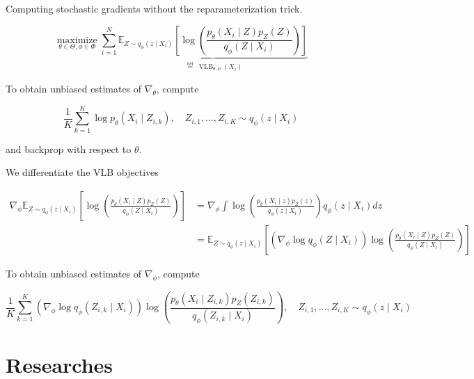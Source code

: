 \documentclass{report}
\begin{document}
\begin{concept}
    Computing stochastic gradients without the reparameterization trick.

    $$
    \underset{\theta \in \Theta, \phi \in \Phi}{\operatorname{maximize}} \sum_{i=1}^{N} \underbrace{\mathbb{E}_{Z \sim q_{\phi}\left(z \mid X_{i}\right)}\left[\log \left(\frac{p_{\theta}\left(X_{i} \mid Z\right) p_{Z}(Z)}{q_{\phi}\left(Z \mid X_{i}\right)}\right)\right]}_{\stackrel{\text { def }}{=} \operatorname{VLB}_{\theta, \phi}\left(X_{i}\right)}
    $$

    To obtain unbiased estimates of $\nabla_{\theta}$, compute

    $$
    \frac{1}{K} \sum_{k=1}^{K} \log p_{\theta}\left(X_{i} \mid Z_{i, k}\right), \quad Z_{i, 1}, \ldots, Z_{i, K} \sim q_{\phi}\left(z \mid X_{i}\right)
    $$

    and backprop with respect to $\theta$.

    We differentiate the VLB objectives

    $$
    \begin{aligned}
    \nabla_{\phi} \mathbb{E}_{Z \sim q_{\phi}\left(z \mid X_{i}\right)}\left[\log \left(\frac{p_{\theta}\left(X_{i} \mid Z\right) p_{Z}(Z)}{q_{\phi}\left(Z \mid X_{i}\right)}\right)\right] & =\nabla_{\phi} \int \log \left(\frac{p_{\theta}\left(X_{i} \mid z\right) p_{Z}(z)}{q_{\phi}\left(z \mid X_{i}\right)}\right) q_{\phi}\left(z \mid X_{i}\right) d z \\
    & =\mathbb{E}_{Z \sim q_{\phi}\left(z \mid X_{i}\right)}\left[\left(\nabla_{\phi} \log q_{\phi}\left(Z \mid X_{i}\right)\right) \log \left(\frac{p_{\theta}\left(X_{i} \mid Z\right) p_{Z}(Z)}{q_{\phi}\left(Z \mid X_{i}\right)}\right)\right]
    \end{aligned}
    $$

    To obtain unbiased estimates of $\nabla_{\phi}$, compute

    $$
    \frac{1}{K} \sum_{k=1}^{K}\left(\nabla_{\phi} \log q_{\phi}\left(Z_{i, k} \mid X_{i}\right)\right) \log \left(\frac{p_{\theta}\left(X_{i} \mid Z_{i, k}\right) p_{Z}\left(Z_{i, k}\right)}{q_{\phi}\left(Z_{i, k} \mid X_{i}\right)}\right), \quad Z_{i, 1}, \ldots, Z_{i, K} \sim q_{\phi}\left(z \mid X_{i}\right)
    $$
\end{concept}

\section{Researches}
\end{document}

